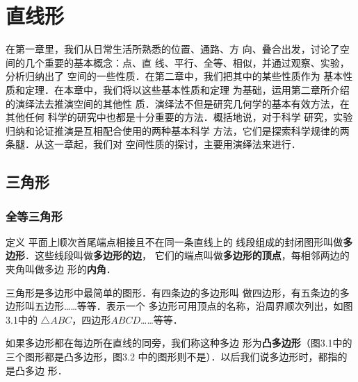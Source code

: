 \chapter{直线形}

在第一章里，我们从日常生活所熟悉的位置、通路、方
向、叠合出发，讨论了空间的几个重要的基本概念：点、直
线、平行、全等、相似，并通过观察、实验，分析归纳出了
空间的一些性质．在第二章中，我们把其中的某些性质作为
基本性质和定理．在本章中，我们将以这些基本性质和定理
为基础，运用第二章所介绍的演绎法去推演空间的其他性
质．演绎法不但是研究几何学的基本有效方法，在其他任何
科学的研究中也都是十分重要的方法．概括地说，对于科学
研究，实验归纳和论证推演是互相配合使用的两种基本科学
方法，它们是探索科学规律的两条腿．从这一章起，我们对
空间性质的探讨，主要用演绎法来进行．
\section{三角形}

\subsection{全等三角形}

\begin{blk}{定义}
    平面上顺次首尾端点相接且不在同一条直线上的
线段组成的封闭图形叫做\textbf{多边形}．这些线段叫做\textbf{多边形的边}，
它们的端点叫做\textbf{多边形的顶点}，每相邻两边的夹角叫做多边
形的\textbf{内角}．
\end{blk}


三角形是多边形中最简单的图形．有四条边的多边形叫
做四边形，有五条边的多边形叫五边形……等等．表示一个
多边形可用顶点的名称，沿周界顺次列出，如图3.1中的
$\triangle ABC$，四边形$ABCD$……等等．

如果多边形都在每边所在直线的同旁，我们称这种多边
形为\textbf{凸多边形}（图3.1中的三个图形都是凸多边形，图3.2
中的图形则不是）．以后我们说多边形时，都指的是凸多边
形．
\begin{figure}[htp]
    \centering
    \caption{}
\end{figure}

